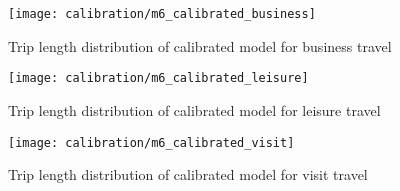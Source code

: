\begin{figure}[H]
\centering
\texttt{[image: calibration/m6\_calibrated\_business]}
\caption{Trip length distribution of calibrated model for business travel}
\label{fig:calibration-business}
\end{figure}


\begin{figure}[H]
\centering
\texttt{[image: calibration/m6\_calibrated\_leisure]}
\caption{Trip length distribution of calibrated model for leisure travel}
\label{fig:calibration-leisure}
\end{figure}


\begin{figure}[H]
\centering
\texttt{[image: calibration/m6\_calibrated\_visit]}
\caption{Trip length distribution of calibrated model for visit travel}
\label{fig:calibration-visit}
\end{figure}



